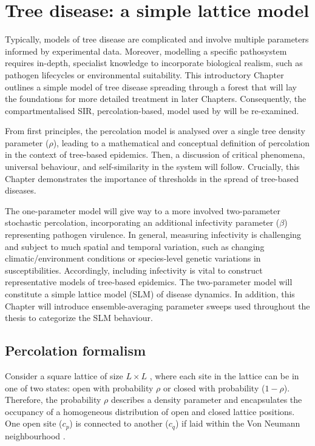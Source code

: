 
\chapter{Tree disease: a simple lattice model}
\label{chapter:SLM}

Typically, models of tree disease are complicated and involve multiple parameters informed by experimental data. Moreover, modelling a specific pathosystem requires in-depth, specialist knowledge to incorporate biological realism, such as pathogen lifecycles or environmental suitability. This introductory Chapter outlines a simple model of tree disease spreading through a forest that will lay the foundations for more detailed treatment in later Chapters.
Consequently, the compartmentalised SIR, percolation-based, model used by \cite{OROZCOFUENTES201912} will be re-examined. 

From first principles, the percolation model is analysed over a single tree density parameter ($\rho$), leading to a mathematical and conceptual definition of percolation in the context of tree-based epidemics. 
Then, a discussion of critical phenomena, universal behaviour, and self-similarity in the system will follow. Crucially, this Chapter demonstrates the importance of thresholds in the spread of tree-based diseases.

The one-parameter model will give way to a more involved two-parameter stochastic percolation, incorporating an additional infectivity parameter ($\beta$) representing pathogen virulence.
In general, measuring infectivity is challenging and subject to much spatial and temporal variation, such as changing climatic/environment conditions or species-level genetic variations in susceptibilities.
Accordingly, including infectivity is vital to construct representative models of tree-based epidemics.
The two-parameter model will constitute a simple lattice model (SLM) of disease dynamics. 
In addition, this Chapter will introduce ensemble-averaging parameter sweeps used throughout the thesis to categorize the SLM behaviour.

\section{Percolation formalism}
\label{sec:perc-form}
Consider a square lattice of size $L \times L$ , where each site in the lattice can be in one of two states: %
open with probability $\rho$ or closed with probability ($1-\rho$). %
Therefore, the probability $\rho$ describes a density parameter and encapsulates the occupancy of a homogeneous distribution of open and closed lattice positions.
One open site ($c_p$) is connected to another ($c_q$) if laid within the Von Neumann neighbourhood \cite{toffoli1987cellular}.

